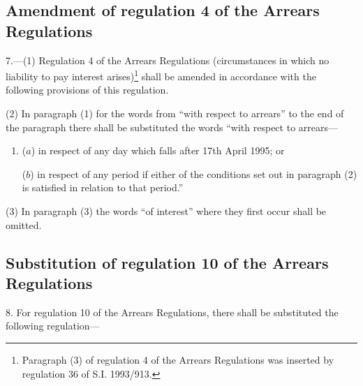 \documentclass[12pt,a4paper]{article}
\begin{document}
\subsection[7. Amendment of regulation 4 of the Arrears Regulations]{Amendment of regulation 4 of the Arrears Regulations}

7.—(1) Regulation 4 of the Arrears Regulations (circumstances in which no liability to pay interest arises)\footnote{\frenchspacing Paragraph (3) of regulation 4 of the Arrears Regulations was inserted by regulation 36 of S.I. 1993/913.} shall be amended in accordance with the following provisions of this regulation.

(2) In paragraph (1) for the words from “with respect to arrears” to the end of the paragraph there shall be substituted the words “with respect to arrears—
\begin{enumerate}\item[]
($a$) in respect of any day which falls after 17th April 1995; or

($b$) in respect of any period if either of the conditions set out in paragraph (2) is satisfied in relation to that period.”
\end{enumerate}

(3) In paragraph (3) the words “of interest” where they first occur shall be omitted.

\subsection[8. Substitution of regulation 10 of the Arrears Regulations]{Substitution of regulation 10 of the Arrears Regulations}

8.  For regulation 10 of the Arrears Regulations, there shall be substituted the following regulation—
\end{document}
